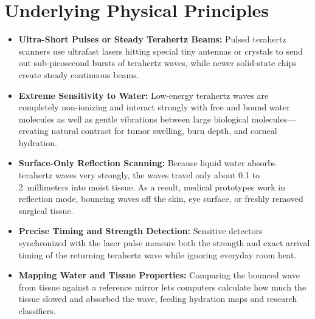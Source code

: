 \section{Underlying Physical Principles}
\begin{itemize}
  \item \textbf{Ultra-Short Pulses or Steady Terahertz Beams:} Pulsed terahertz scanners use ultrafast lasers hitting special tiny antennas or crystals to send out sub-picosecond bursts of terahertz waves, while newer solid-state chips create steady continuous beams.
  \item \textbf{Extreme Sensitivity to Water:} Low-energy terahertz waves are completely non-ionizing and interact strongly with free and bound water molecules as well as gentle vibrations between large biological molecules---creating natural contrast for tumor swelling, burn depth, and corneal hydration.
  \item \textbf{Surface-Only Reflection Scanning:} Because liquid water absorbs terahertz waves very strongly, the waves travel only about 0.1 to 2~millimeters into moist tissue. As a result, medical prototypes work in reflection mode, bouncing waves off the skin, eye surface, or freshly removed surgical tissue.
  \item \textbf{Precise Timing and Strength Detection:} Sensitive detectors synchronized with the laser pulse measure both the strength and exact arrival timing of the returning terahertz wave while ignoring everyday room heat.
  \item \textbf{Mapping Water and Tissue Properties:} Comparing the bounced wave from tissue against a reference mirror lets computers calculate how much the tissue slowed and absorbed the wave, feeding hydration maps and research classifiers.
\end{itemize}


